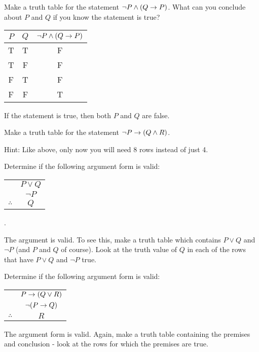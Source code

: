 \begin{questions}
\question Make a truth table for the statement $\neg P \wedge (Q \rightarrow P)$.  What can you conclude about $P$ and $Q$ if you know the statement is true?

    \begin{answer}
      \begin{tabular}{c|c|c}
             $P$ & $Q$ & $\neg P \wedge (Q \rightarrow P)$\\ \hline
             T & T & F \\
             T & F & F \\
             F & T & F \\
             F & F & T
          \end{tabular}
	If the statement is true, then both $P$ and $Q$ are false.
    \end{answer}


\question Make a truth table for the statement $\neg P \rightarrow (Q \wedge R)$.

  \begin{answer}
    Hint: Like above, only now you will need 8 rows instead of just 4.
  \end{answer}



\question Determine if the following argument form is valid: \begin{tabular}{rc} & $P \vee Q$ \\ & $\neg P$ \\ \hline $\therefore$ & $Q$\end{tabular}.

  \begin{answer}
    The argument is valid.  To see this, make a truth table which contains $P \vee Q$ and $\neg P$ (and $P$ and $Q$ of course).  Look at the truth value of $Q$ in each of the rows that have $P \vee Q$ and $\neg P$ true.  
  \end{answer}

  
  
  
\question Determine if the following argument form is valid: \begin{tabular}{rc} & $P \rightarrow (Q \vee R)$ \\ & $\neg(P \rightarrow Q)$ \\ \hline $\therefore$ & $R$\end{tabular}

  \begin{answer}
    The argument form is valid.  Again, make a truth table containing the premises and conclusion - look at the rows for which the premises are true.
  \end{answer}



\end{questions}
